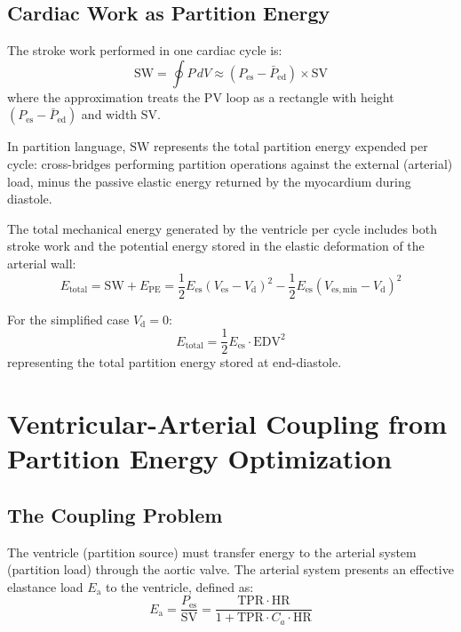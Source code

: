 \documentclass[10pt,twocolumn,a4paper]{article}
\theoremstyle{remark}
\newcommand{\Ees}{E_{\mathrm{es}}}
\newcommand{\Ea}{E_{\mathrm{a}}}
\newcommand{\Vd}{V_{\mathrm{d}}}
\newcommand{\Pes}{P_{\mathrm{es}}}
\newcommand{\SV}{\mathrm{SV}}
\newcommand{\HR}{\mathrm{HR}}
\newcommand{\TPR}{\mathrm{TPR}}
\newcommand{\EDV}{\mathrm{EDV}}
\newcommand{\SW}{\mathrm{SW}}
\begin{document}
\subsection{Cardiac Work as Partition Energy}

The stroke work performed in one cardiac cycle is:
\begin{equation}
    \SW = \oint P \, dV \approx (P_{\mathrm{es}} - \bar{P}_{\mathrm{ed}}) \times \SV
    \label{eq:sw}
\end{equation}
where the approximation treats the PV loop as a rectangle with height $(P_{\mathrm{es}} - \bar{P}_{\mathrm{ed}})$ and width $\SV$.

In partition language, $\SW$ represents the total partition energy expended per cycle: cross-bridges performing partition operations against the external (arterial) load, minus the passive elastic energy returned by the myocardium during diastole.

The total mechanical energy generated by the ventricle per cycle includes both stroke work and the potential energy stored in the elastic deformation of the arterial wall:
\begin{equation}
    E_{\mathrm{total}} = \SW + E_{\mathrm{PE}} = \frac{1}{2}\Ees(V_{\mathrm{es}} - \Vd)^2 - \frac{1}{2}\Ees(V_{\mathrm{es,min}} - \Vd)^2
    \label{eq:total_energy}
\end{equation}

For the simplified case $\Vd = 0$:
\begin{equation}
    E_{\mathrm{total}} = \frac{1}{2}\Ees \cdot \EDV^2
    \label{eq:total_energy_simple}
\end{equation}
representing the total partition energy stored at end-diastole.


\section{Ventricular-Arterial Coupling from Partition Energy Optimization}
\label{sec:coupling}

\subsection{The Coupling Problem}

The ventricle (partition source) must transfer energy to the arterial system (partition load) through the aortic valve. The arterial system presents an effective elastance load $\Ea$ to the ventricle, defined as:
\begin{equation}
    \Ea = \frac{\Pes}{\SV} = \frac{\TPR \cdot \HR}{1 + \TPR \cdot C_a \cdot \HR}
    \label{eq:Ea}
\end{equation}
\end{document}
